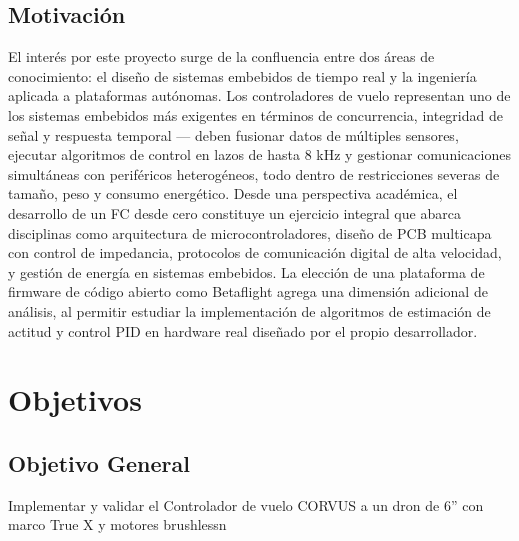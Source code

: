 \documentclass[12pt, letterpaper]{report}
\begin{document}
\subsection{Motivación}
El interés por este proyecto surge de la confluencia entre dos áreas de conocimiento: el diseño de sistemas embebidos de tiempo real y la ingeniería aplicada a plataformas autónomas. Los controladores de vuelo representan uno de los sistemas embebidos más exigentes en términos de concurrencia, integridad de señal y respuesta temporal — deben fusionar datos de múltiples sensores, ejecutar algoritmos de control en lazos de hasta 8 kHz y gestionar comunicaciones simultáneas con periféricos heterogéneos, todo dentro de restricciones severas de tamaño, peso y consumo energético.
Desde una perspectiva académica, el desarrollo de un FC desde cero constituye un ejercicio integral que abarca disciplinas como arquitectura de microcontroladores, diseño de PCB multicapa con control de impedancia, protocolos de comunicación digital de alta velocidad, y gestión de energía en sistemas embebidos. La elección de una plataforma de firmware de código abierto como Betaflight agrega una dimensión adicional de análisis, al permitir estudiar la implementación de algoritmos de estimación de actitud y control PID en hardware real diseñado por el propio desarrollador.
\pagebreak

\section{Objetivos}
\subsection{Objetivo General}
Implementar  y validar el Controlador de vuelo CORVUS a un dron de 6” con marco True X y motores brushlessn
\end{document}
